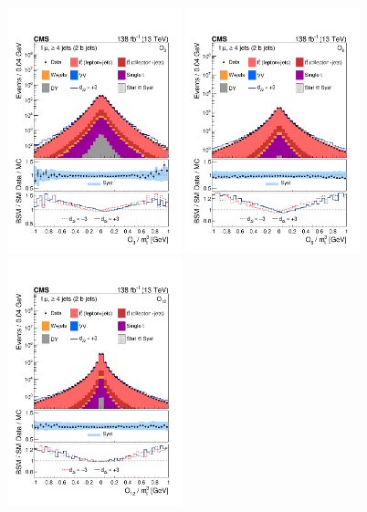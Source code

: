 \begin{figure}[p]
    \centering
    \includegraphics[width=0.45\textwidth]{figure/Figure_002-a.pdf}
    \includegraphics[width=0.45\textwidth]{figure/Figure_002-b.pdf}
    \includegraphics[width=0.45\textwidth]{figure/Figure_002-c.pdf}

\end{figure}
